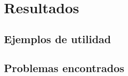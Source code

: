
\chapter{Resultados} %

\label{Chapter5} %


\section{Ejemplos de utilidad}


\section{Problemas encontrados}
